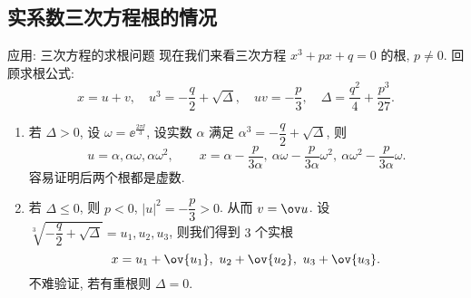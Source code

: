 \subsection{实系数三次方程根的情况}


\begin{frame}{应用: 三次方程的求根问题\noexer}
	\onslide<+->
	现在我们来看三次方程 $x^3+px+q=0$ 的根, $p\neq 0$.
	\onslide<+->
	回顾求根公式:
	\[
		x=u+v,\quad
		u^3=-\frac q2+\sqrt{\Delta},\quad
		uv=-\frac p3,\quad
		\Delta=\frac{q^2}4+\frac{p^3}{27}.
	\]
	\vspace{-\baselineskip}
	\begin{enumerate}
		\item 若 $\Delta>0$, 设 $\omega=\ee^{\frac{2\pi\ii}3}$, 设实数 $\alpha$ 满足 $\alpha^3=-\dfrac q2+\sqrt{\Delta}$,
		\onslide<+->
		则
		\[
			u=\alpha,\alpha\omega,\alpha\omega^2,\qquad
			x=\alpha-\frac p{3\alpha},\ 
				\alpha\omega-\frac p{3\alpha} \omega^2,\ 
				\alpha\omega^2-\frac p{3\alpha} \omega.
		\]
		\onslide<+->
		容易证明后两个根都是虚数.
		\item 若 $\Delta\le 0$, 则 $p<0$, $|u|^2=-\dfrac p3>0$. 
		\onslide<+->
		从而 $v=\ov u$.
		\onslide<+->
		设 $\sqrt[3]{-\dfrac q2+\sqrt{\Delta}}=u_1,u_2,u_3$,
		\onslide<+->
		则我们得到 $3$ 个实根
		\[
			x=u_1+\ov{u_1},\ u_2+\ov{u_2},\ u_3+\ov{u_3}.
		\]
		\onslide<+->
		不难验证, 若有重根则 $\Delta=0$.
	\end{enumerate}
\end{frame}


